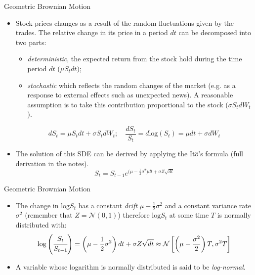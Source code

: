\documentclass{beamer}
\begin{document}
\begin{frame}{Geometric Brownian Motion}
\begin{itemize}
\item Stock prices changes as a result of the random fluctuations given by the trades. The relative change in its price in a period $dt$ can be decomposed into two parts:
\begin{itemize}
    \item \emph{deterministic}, the expected return from the stock hold during the time period $dt$ ($\mu S_tdt$);
    \item \emph{stochastic} which reflects the random changes of the market (e.g. as a response to external effects such as unexpected news). A reasonable assumption is to take this contribution proportional to the stock ($\sigma S_t dW_t$).
\end{itemize}
\begin{equation*}
dS_t = \mu S_tdt + \sigma S_tdW_t;\quad\frac{dS_t}{S_t} = d\textrm{log}(S_t) = \mu dt + \sigma dW_t 
\end{equation*}
\item The solution of this SDE can be derived by applying the It$\hat{o}$'s formula (full derivation in the notes).
\begin{equation*}
S_t = S_{t-1}e^{\big(\mu - \frac{1}{2}\sigma^2\big)dt + \sigma Z\sqrt{dt}}
\end{equation*}
\end{itemize}
\end{frame}

\begin{frame}{Geometric Brownian Motion}
\begin{itemize}
\item The change in $\textrm{log} S_t$ has a constant \emph{drift} $\mu - \frac{1}{2}\sigma^2$ and a constant variance rate $\sigma^2$ (remember that $Z=\mathcal{N}(0,1)$) therefore $\textrm{log} S_t$ at some time $T$ is normally distributed with:
\begin{equation*}
\textrm{log}\left(\cfrac{S_t}{S_{t-1}}\right) = \left(\mu - \frac{1}{2}\sigma^2\right)dt + \sigma Z\sqrt{dt} \approx\mathcal{N}\left[\left(\mu-\frac{\sigma^2}{2}\right)T, \sigma^2 T\right]
\end{equation*}
\item A variable whose logarithm is normally distributed is said to be \emph{log-normal}.
\end{itemize}
\end{frame}
\end{document}
